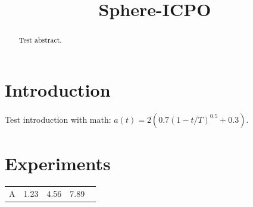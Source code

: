 \documentclass[11pt,a4paper]{article}
\title{Sphere-ICPO}
\author{}
\date{}
\begin{document}
\maketitle
\begin{abstract}
Test abstract.
\end{abstract}
\section{Introduction}
Test introduction with math: $a(t) = 2(0.7(1-t/T)^{0.5}+0.3)$.
\section{Experiments}
\begin{table}[h]
\centering
\begin{tabular}{lccc}
\hline
A & 1.23 & 4.56 & 7.89 \
\hline
\end{tabular}
\end{table}
\end{document}
